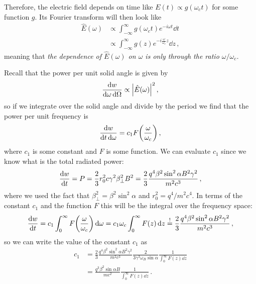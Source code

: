 \documentclass[main.tex]{subfiles}
\begin{document}
Therefore, the electric field depends on time like \(E(t) \propto g(\omega _c t)\) for some function \(g\). 
Its Fourier transform will then look like 
%
\begin{align}
\hat{E}(\omega ) &\propto \int_{- \infty }^{\infty } g(\omega _c t) e^{-i \omega t} \dd{t}  \\
&\propto \int_{-\infty }^{\infty } g(z) e^{-i \frac{\omega}{\omega _c} z} \dd{z}
\,,
\end{align}
%
meaning that \emph{the dependence of \(\hat{E}(\omega )\) on \(\omega \) is only through the ratio \(\omega / \omega _c\).}

Recall that the power per unit solid angle is given by 
%
\begin{align}
\frac{ \dd{w}}{ \dd{\omega } \dd{\Omega }} \propto \abs{\hat{E}(\omega )}^2
\,,
\end{align}
%
so if we integrate over the solid angle and divide by the period we find that the power per unit frequency is 
%
\begin{align}
\frac{ \dd{w}}{ \dd{t} \dd{\omega }} = c_1 F \qty(\frac{\omega }{\omega _c} )
\,,
\end{align}
%
where \(c_1 \) is some constant and \(F\) is some function. 
We can evaluate \(c_1 \) since we know what is the total radiated power: 
%
\begin{align}
\dv{w}{t} = P 
= \frac{2}{3} r_0^2 c \gamma^2 \beta_{\perp}^2B^2 
= \frac{2}{3} \frac{q^{4} \beta^2 \sin^2 \alpha B^2 \gamma^2}{m^2 c^3}
\,,
\end{align}
%
where we used the fact that \(\beta _\perp^2 = \beta^2 \sin^2 \alpha \) and \(r_0^2= q^{4} / m^2 c^{4}\). 
In terms of the constant \(c_1 \) and the function \(F\) this will be the integral over the frequency space: 
%
\begin{align}
\dv{w}{t} 
= c_1 \int_0^{\infty} F \qty(\frac{\omega }{\omega _c}) \dd{\omega }  = 
c_1 \omega _c \int_0^{\infty } F(z) \dd{z} \overset{!}{=} 
\frac{2}{3} \frac{q^{4} \beta^2 \sin^2 \alpha B^2 \gamma^2}{m^2 c^3}
\,,
\end{align}
%
so we can write the value of the constant \(c_1 \) as 
%
\begin{align}
c_1 &= \frac{2}{3} \frac{q^{4} \beta^2 \sin^2 \alpha B^2 \gamma^2}{m^2 c^3} \frac{2}{3 \gamma^3 \omega _B \sin \alpha } \frac{1}{
\int_0^{\infty } F(z) \dd{z} 
}   \\
&= \frac{q^3 \beta^2  \sin \alpha B}{mc^2} \frac{1}{\int_0^{ \infty } F(z) \dd{z}}
\,.
\end{align}
\end{document}
